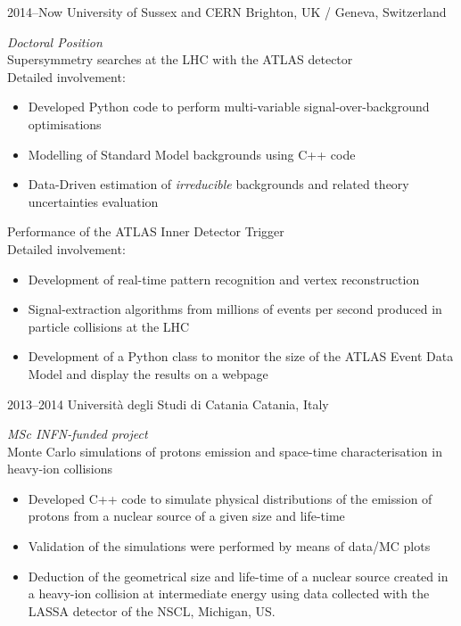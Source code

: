 \documentclass[]{cv} %
\begin{document}
\begin{entrylist}
  \entry
      {2014--Now}
      {University of Sussex and CERN}
      {Brighton, UK / Geneva, Switzerland}
      {\emph{Doctoral Position}\\
      Supersymmetry searches at the LHC with the ATLAS detector\\
      Detailed involvement: 
      \begin{itemize}
        \item Developed Python code to perform multi-variable signal-over-background optimisations 
        \item Modelling of Standard Model backgrounds using C++ code
        \item Data-Driven estimation of \emph{irreducible} backgrounds and related theory uncertainties evaluation 
      \end{itemize}\medskip
      Performance of the ATLAS Inner Detector Trigger\\
      Detailed involvement: 
      \begin{itemize}
        \item Development of real-time pattern recognition and vertex reconstruction 
        \item Signal-extraction algorithms from millions of events per second produced in particle collisions at the LHC
        \item Development of a Python class to monitor the size of the ATLAS Event Data Model and display the results on a webpage
      \end{itemize}      
      }

  \entry
      {2013--2014}
      {Università degli Studi di Catania}
      {Catania, Italy}
      {\emph{MSc INFN-funded project}\\
      Monte Carlo simulations of protons emission and space-time characterisation in heavy-ion collisions
      \begin{itemize}
        \item Developed C++ code to simulate physical distributions of the emission of protons from a nuclear source of a given size and life-time
        \item Validation of the simulations were performed by means of data/MC plots 
        \item Deduction of the geometrical size and life-time of a nuclear source created in a heavy-ion collision at intermediate energy using data collected with the LASSA detector of the NSCL, Michigan, US.
      \end{itemize}
      }

\end{entrylist}
\end{document}
